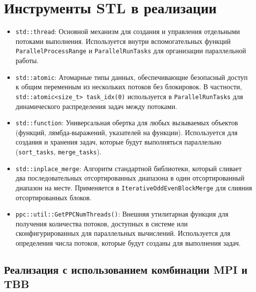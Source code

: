 \documentclass[12pt,a4paper]{extarticle}
\begin{document}
\section*{Инструменты STL в реализации}
\begin{itemize}
    
    \item \texttt{std::thread}:
        Основной механизм для создания и управления отдельными потоками выполнения. Используется внутри вспомогательных функций \texttt{ParallelProcessRange} и \texttt{ParallelRunTasks} для организации параллельной работы.
        
    \item \texttt{std::atomic}:
        Атомарные типы данных, обеспечивающие безопасный доступ к общим переменным из нескольких потоков без блокировок. В частности, \texttt{std::atomic<size\_t> task\_idx(0)} используется в \texttt{ParallelRunTasks} для динамического распределения задач между потоками.
        
    \item \texttt{std::function}:
        Универсальная обертка для любых вызываемых объектов (функций, лямбда-выражений, указателей на функции). Используется для создания и хранения задач, которые будут выполняться параллельно (\texttt{sort\_tasks}, \texttt{merge\_tasks}).
        
    \item \texttt{std::inplace\_merge}:
        Алгоритм стандартной библиотеки, который сливает два последовательных отсортированных диапазона в один отсортированный диапазон на месте. Применяется в \texttt{IterativeOddEvenBlockMerge} для слияния отсортированных блоков.
        
    \item \texttt{ppc::util::GetPPCNumThreads()}:
        Внешняя утилитарная функция для получения количества потоков, доступных в системе или сконфигурированных для параллельных вычислений. Используется для определения числа потоков, которые будут созданы для выполнения задач.
\end{itemize}

	\subsection{Реализация с использованием комбинации MPI и TBB}
\end{document}
